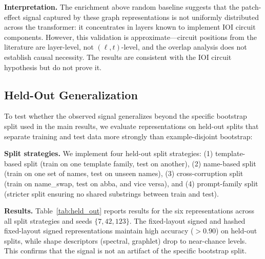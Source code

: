 \documentclass[11pt,a4paper]{article}
\begin{document}
\textbf{Interpretation.} The enrichment above random baseline suggests that the patch-effect signal captured by these graph representations is not uniformly distributed across the transformer: it concentrates in layers known to implement IOI circuit components. However, this validation is approximate---circuit positions from the literature are layer-level, not $(\ell, t)$-level, and the overlap analysis does not establish causal necessity. The results are consistent with the IOI circuit hypothesis but do not prove it.

\subsection{Held-Out Generalization}
\label{sec:held_out}

To test whether the observed signal generalizes beyond the specific bootstrap split used in the main results, we evaluate representations on held-out splits that separate training and test data more strongly than example-disjoint bootstrap:

\textbf{Split strategies.} We implement four held-out split strategies: (1) template-based split (train on one template family, test on another), (2) name-based split (train on one set of names, test on unseen names), (3) cross-corruption split (train on name\_swap, test on abba, and vice versa), and (4) prompt-family split (stricter split ensuring no shared substrings between train and test).

\textbf{Results.} Table~\ref{tab:held_out} reports results for the six representations across all split strategies and seeds $\{7, 42, 123\}$. The fixed-layout signed and hashed fixed-layout signed representations maintain high accuracy ($> 0.90$) on held-out splits, while shape descriptors (spectral, graphlet) drop to near-chance levels. This confirms that the signal is not an artifact of the specific bootstrap split.
\end{document}
